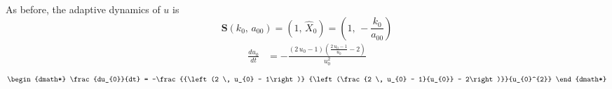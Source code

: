\documentclass{article}
\begin{document}
As before, the adaptive dynamics of $u$ is
\[
  \mathbf S \left(k_{0},\,{a}_{00}\right) = \left(1,\,\hat{X}_{0}\right) = \left(1,\,-\frac{k_{0}}{{a}_{00}}\right)
\]
\iflatexml
\begin{align*}
\frac{du_{0}}{dt} &= -\frac{{\left(2 \, u_{0} - 1\right)} {\left(\frac{2 \, u_{0} - 1}{u_{0}} - 2\right)}}{u_{0}^{2}}
\end{align*}
\else
\begin{dgroup*}
\begin{dmath*}
\frac{du_{0}}{dt} = -\frac{{\left(2 \, u_{0} - 1\right)} {\left(\frac{2 \, u_{0} - 1}{u_{0}} - 2\right)}}{u_{0}^{2}}
\end{dmath*}
\end{dgroup*}
\fi
\end{document}
